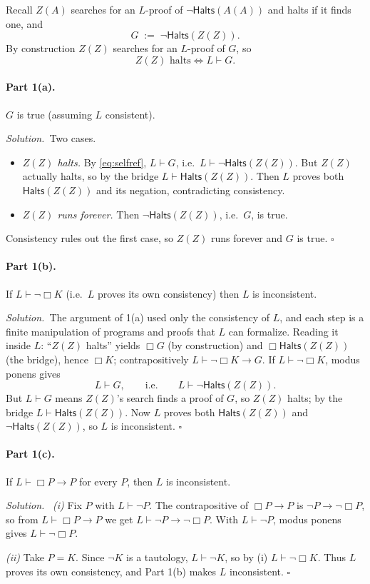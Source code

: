 \documentclass[11pt]{article}
\newcommand{\proves}{\vdash}
\newcommand{\Halts}{\mathsf{Halts}}
\newcommand{\bx}{\Box}
\newcommand{\soln}{\medskip\noindent\textit{Solution.}\ }
\renewcommand{\qed}{\ensuremath{\square}}
\begin{document}
\begin{solution}[ex:godel]
Recall $Z(A)$ searches for an $L$-proof of $\neg\Halts(A(A))$ and halts if it finds one, and
\[
  G \;:=\; \neg\Halts(Z(Z)).
\]
By construction $Z(Z)$ searches for an $L$-proof of $G$, so
\begin{equation}\label{eq:selfref}
  Z(Z)\text{ halts} \iff L\proves G. \tag{$\star$}
\end{equation}

\paragraph{Part 1(a).} $G$ is true (assuming $L$ consistent).

\soln Two cases.
\begin{itemize}[leftmargin=1.5em]
\item \emph{$Z(Z)$ halts.} By \eqref{eq:selfref}, $L\proves G$, i.e.\ $L\proves\neg\Halts(Z(Z))$. But $Z(Z)$ actually halts, so by the bridge $L\proves\Halts(Z(Z))$. Then $L$ proves both $\Halts(Z(Z))$ and its negation, contradicting consistency.
\item \emph{$Z(Z)$ runs forever.} Then $\neg\Halts(Z(Z))$, i.e.\ $G$, is true.
\end{itemize}
Consistency rules out the first case, so $Z(Z)$ runs forever and $G$ is true. \qed

\paragraph{Part 1(b).} If $L\proves\neg\bx K$ (i.e.\ $L$ proves its own consistency) then $L$ is inconsistent.

\soln The argument of 1(a) used only the consistency of $L$, and each step is a finite manipulation of programs and proofs that $L$ can formalize. Reading it inside $L$: ``$Z(Z)$ halts'' yields $\bx G$ (by construction) and $\bx\Halts(Z(Z))$ (the bridge), hence $\bx K$; contrapositively $L\proves \neg\bx K \to G$. If $L\proves\neg\bx K$, modus ponens gives
\[
  L\proves G,\qquad\text{i.e.}\qquad L\proves\neg\Halts(Z(Z)).
\]
But $L\proves G$ means $Z(Z)$'s search finds a proof of $G$, so $Z(Z)$ halts; by the bridge $L\proves\Halts(Z(Z))$. Now $L$ proves both $\Halts(Z(Z))$ and $\neg\Halts(Z(Z))$, so $L$ is inconsistent. \qed

\paragraph{Part 1(c).} If $L\proves \bx P\to P$ for every $P$, then $L$ is inconsistent.

\soln
\emph{(i)} Fix $P$ with $L\proves\neg P$. The contrapositive of $\bx P\to P$ is $\neg P\to\neg\bx P$, so from $L\proves\bx P\to P$ we get $L\proves\neg P\to\neg\bx P$. With $L\proves\neg P$, modus ponens gives $L\proves\neg\bx P$.

\emph{(ii)} Take $P=K$. Since $\neg K$ is a tautology, $L\proves\neg K$, so by (i) $L\proves\neg\bx K$. Thus $L$ proves its own consistency, and Part 1(b) makes $L$ inconsistent. \qed
\end{solution}
\end{document}
